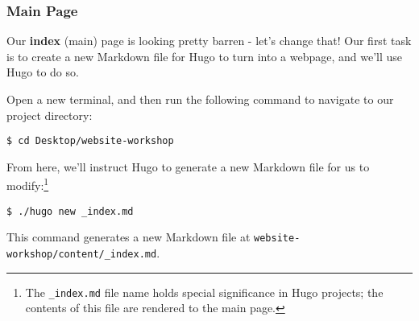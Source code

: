\begin{frame}[fragile]
    \frametitle{Main Page}

    Our \textbf{index} (main) page is looking pretty barren - let's change that! Our first task is to create a new 
    Markdown file for Hugo to turn into a webpage, and we'll use Hugo to do so.    

    \smallskip

    Open a new terminal, and then run the following command to navigate to our project directory:

    \medskip

    \begin{lstlisting}[style=saneCode,gobble=8]
        $ cd Desktop/website-workshop
    \end{lstlisting}

    \vfill

    From here, we'll instruct Hugo to generate a new Markdown file for us to modify:\footnote{
      The \texttt{\_index.md} file name holds special significance in Hugo projects; the contents of this file are
      rendered to the main page.
    }

    \medskip

    \begin{lstlisting}[style=saneCode,gobble=8]
        $ ./hugo new _index.md
    \end{lstlisting}

    \smallskip

    This command generates a new Markdown file at \texttt{website-workshop/content/\_index.md}.
\end{frame}